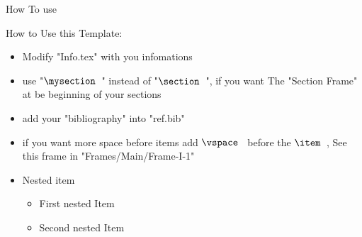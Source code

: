 \begin{frame}{How To use}

How to Use this Template:

    \begin{itemize}[<+->]
        \item Modify "Info.tex" with you infomations
        \item use "$\texttt{\detokenize{\mysection}}$" instead of "$\texttt{\detokenize{\section}}$", if you want The "Section Frame" at be beginning of your sections
        \item add your "bibliography" into "ref.bib"
        
        \vspace{5mm}
        \item if you want more space before items add $\texttt{\detokenize{\vspace}}$ before the $\texttt{\detokenize{\item}}$, See this frame in "Frames/Main/Frame-I-1"
        
        \item Nested item
        \begin{itemize}[<.->]
            \item First nested Item
            \item Second nested Item
        \end{itemize}
        
        
    \end{itemize}
\end{frame}